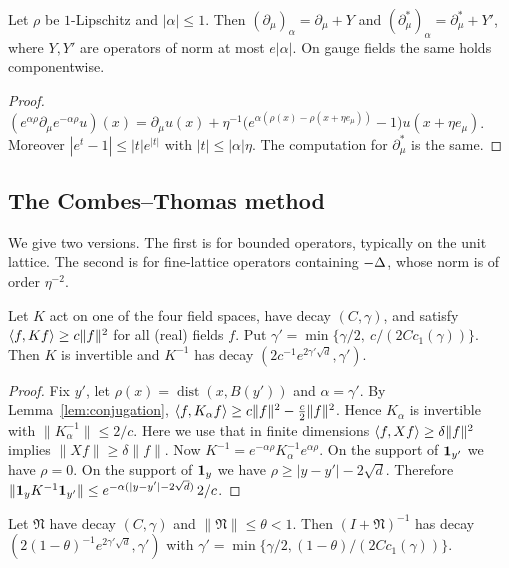 \begin{lemma}\label{lem:conj-derivative}
Let $\rho$ be $1$-Lipschitz and $|\alpha|\le1$. Then $(\partial_\mu)_\alpha=\partial_\mu+Y$ and $(\partial_\mu^*)_\alpha=\partial_\mu^*+Y'$, where $Y,Y'$ are operators of norm at most $e|\alpha|$. On gauge fields the same holds componentwise.
\end{lemma}

\begin{proof}
$(e^{\alpha\rho}\partial_\mu e^{-\alpha\rho}u)(x)=\partial_\mu u(x)+\eta^{-1}\big(e^{\alpha(\rho(x)-\rho(x+\eta e_\mu))}-1\big)u(x+\eta e_\mu)$. Moreover $|e^t-1|\le|t|e^{|t|}$ with $|t|\le|\alpha|\eta$. The computation for $\partial_\mu^*$ is the same.
\end{proof}

\subsection{The Combes--Thomas method}

We give two versions. The first is for bounded operators, typically on the unit lattice. The second is for fine-lattice operators containing $-\Delta$, whose norm is of order $\eta^{-2}$.

\begin{lemma}\label{lem:CT-bounded}
Let $K$ act on one of the four field spaces, have decay $(C,\gamma)$, and satisfy $\langle f,Kf\rangle\ge c\|f\|^2$ for all (real) fields $f$. Put $\gamma'=\min\{\gamma/2,\ c/(2Cc_1(\gamma))\}$. Then $K$ is invertible and $K^{-1}$ has decay $(2c^{-1}e^{2\gamma'\sqrt d},\gamma')$.
\end{lemma}

\begin{proof}
Fix $y'$, let $\rho(x)=\operatorname{dist}(x,B(y'))$ and $\alpha=\gamma'$. By Lemma~\ref{lem:conjugation}, $\langle f,K_\alpha f\rangle\ge c\|f\|^2-\frac c2\|f\|^2$. Hence $K_\alpha$ is invertible with $\|K_\alpha^{-1}\|\le2/c$. Here we use that in finite dimensions $\langle f,Xf\rangle\ge\delta\|f\|^2$ implies $\|Xf\|\ge\delta\|f\|$. Now $K^{-1}=e^{-\alpha\rho}K_\alpha^{-1}e^{\alpha\rho}$. On the support of $\mathbf 1_{y'}$ we have $\rho=0$. On the support of $\mathbf 1_y$ we have $\rho\ge|y-y'|-2\sqrt d$. Therefore $\|\mathbf 1_yK^{-1}\mathbf 1_{y'}\|\le e^{-\alpha(|y-y'|-2\sqrt d)}\,2/c$.
\end{proof}

\begin{lemma}\label{lem:neumann}
Let $\mathfrak N$ have decay $(C,\gamma)$ and $\|\mathfrak N\|\le\theta<1$. Then $(I+\mathfrak N)^{-1}$ has decay $(2(1-\theta)^{-1}e^{2\gamma'\sqrt d},\gamma')$ with $\gamma'=\min\{\gamma/2,(1-\theta)/(2Cc_1(\gamma))\}$.
\end{lemma}

